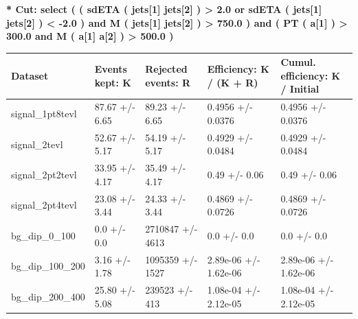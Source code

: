 \documentclass[a4paper, 10pt]{article}
\begin{document}
\textbf{* Cut: select ( ( sdETA ( jets[1] jets[2] ) > 2.0 or sdETA ( jets[1] jets[2] ) < -2.0 ) and M ( jets[1] jets[2] ) > 750.0 ) and ( PT ( a[1] ) > 300.0 and M ( a[1] a[2] ) > 500.0 )}\\
   \begin{table}[H]
  \begin{center}
    \begin{tabular}{|m{20.0mm}|m{27.0mm}|m{27.0mm}|m{33.0mm}|m{32.0mm}|}
      \hline
      {\cellcolor{yellow}         Dataset}& {\cellcolor{yellow}         Events kept:
          K}& {\cellcolor{yellow}         Rejected events:
          R}& {\cellcolor{yellow}         Efficiency:
          K /\- (K + R)}& {\cellcolor{yellow}         Cumul. efficiency:
          K /\- Initial}\\
      \hline
      {\cellcolor{white}         signal\_1pt8tevl}& {\cellcolor{white}         87.67 +/\-- 6.65}& {\cellcolor{white}         89.23 +/\-- 6.65}& {\cellcolor{white}         0.4956 +/\-- 0.0376}& {\cellcolor{white}         0.4956 +/\-- 0.0376}\\
      \hline
      {\cellcolor{white}         signal\_2tevl}& {\cellcolor{white}         52.67 +/\-- 5.17}& {\cellcolor{white}         54.19 +/\-- 5.17}& {\cellcolor{white}         0.4929 +/\-- 0.0484}& {\cellcolor{white}         0.4929 +/\-- 0.0484}\\
      \hline
      {\cellcolor{white}         signal\_2pt2tevl}& {\cellcolor{white}         33.95 +/\-- 4.17}& {\cellcolor{white}         35.49 +/\-- 4.17}& {\cellcolor{white}         0.49 +/\-- 0.06}& {\cellcolor{white}         0.49 +/\-- 0.06}\\
      \hline
      {\cellcolor{white}         signal\_2pt4tevl}& {\cellcolor{white}         23.08 +/\-- 3.44}& {\cellcolor{white}         24.33 +/\-- 3.44}& {\cellcolor{white}         0.4869 +/\-- 0.0726}& {\cellcolor{white}         0.4869 +/\-- 0.0726}\\
      \hline
      {\cellcolor{white}         bg\_dip\_0\_100}& {\cellcolor{white}         0.0 +/\-- 0.0}& {\cellcolor{white}         2710847 +/\-- 4613}& {\cellcolor{white}         0.0 +/\-- 0.0}& {\cellcolor{white}         0.0 +/\-- 0.0}\\
      \hline
      {\cellcolor{white}         bg\_dip\_100\_200}& {\cellcolor{white}         3.16 +/\-- 1.78}& {\cellcolor{white}         1095359 +/\-- 1527}& {\cellcolor{white}         2.89e-06 +/\-- 1.62e-06}& {\cellcolor{white}         2.89e-06 +/\-- 1.62e-06}\\
      \hline
      {\cellcolor{white}         bg\_dip\_200\_400}& {\cellcolor{white}         25.80 +/\-- 5.08}& {\cellcolor{white}         239523 +/\-- 413}& {\cellcolor{white}         1.08e-04 +/\-- 2.12e-05}& {\cellcolor{white}         1.08e-04 +/\-- 2.12e-05}\\

\end{tabular}
\end{center}
\end{table}
\end{document}
